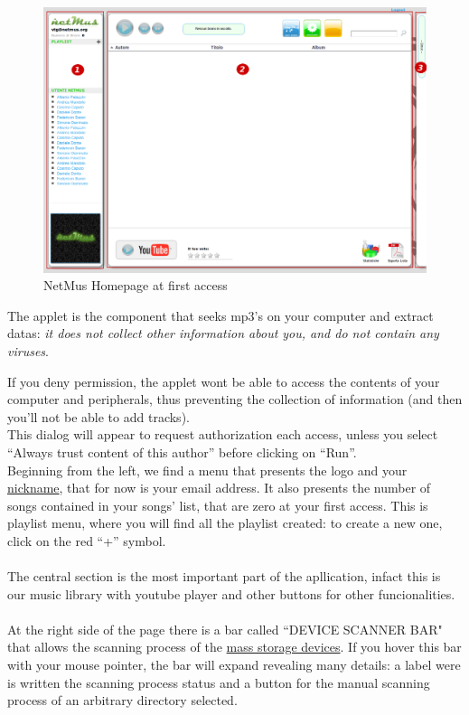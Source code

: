 \begin{figure}[htbp]
  \centering
  \includegraphics[width=15cm]{img/MU/profile_blank.png}
\caption{NetMus Homepage at first access}
\label{fig:permessiApplet}
\end{figure}

The applet is the  component that seeks mp3's on your computer and
extract datas: \emph{it does not collect other information about you, and do not
contain any viruses}.

If you deny permission, the applet wont be able to access the contents of your
computer and peripherals, thus preventing the collection of information
(and then you'll not be able to add tracks).\\
This dialog will appear to request authorization each
access, unless you select ``Always trust content of
this author'' before clicking on ``Run''.\\


Beginning from the left, we find a menu that presents the  logo and
your \underline{nickname}, that for now is your email address. It also presents
the number of songs contained in your songs' list, that are zero at your first
access. This is playlist menu, where you will find all the playlist created: 
to create a new one, click on the red ``+'' symbol.\\
\\
The central section is the most important part of the apllication, infact this
is our music library with youtube player and other buttons for other
funcionalities.\\
\\
At the right side of the page there is a bar called ``DEVICE SCANNER BAR" that
allows the scanning process of the \underline{mass storage devices}. If you
hover this bar with your mouse pointer, the bar will expand revealing many details: a label were is
written  the scanning process status and a button for the manual scanning
process of an arbitrary directory selected.\\

